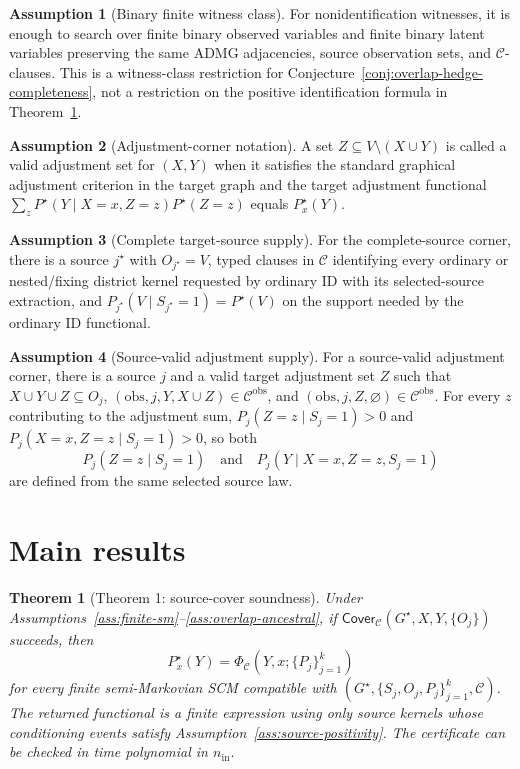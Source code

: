 \documentclass[11pt]{article}
\theoremstyle{definition}
\newtheorem{assumption}{Assumption}
\theoremstyle{plain}
\newtheorem{theorem}{Theorem}
\theoremstyle{remark}
\begin{document}
\begin{assumption}[Binary finite witness class]\label{ass:binary-witness}
For nonidentification witnesses, it is enough to search over finite binary
observed variables and finite binary latent variables preserving the same
ADMG adjacencies, source observation sets, and \(\mathcal C\)-clauses.  This
is a witness-class restriction for Conjecture~\ref{conj:overlap-hedge-completeness},
not a restriction on the positive identification formula in
Theorem~\ref{thm:source-cover-soundness}.
\end{assumption}

\begin{assumption}[Adjustment-corner notation]\label{ass:adjustment-corner}
A set \(Z\subseteq V\setminus (X\cup Y)\) is called a valid adjustment set for
\((X,Y)\) when it satisfies the standard graphical adjustment criterion in
the target graph and the target adjustment functional
\(\sum_z P^\star(Y\mid X=x,Z=z)P^\star(Z=z)\) equals \(P^\star_x(Y)\).
\end{assumption}

\begin{assumption}[Complete target-source supply]\label{ass:complete-source}
For the complete-source corner, there is a source \(j^\star\) with
\(O_{j^\star}=V\), typed clauses in \(\mathcal C\) identifying every
ordinary or nested/fixing district kernel requested by ordinary ID with its
selected-source extraction, and
\(P_{j^\star}(V\mid S_{j^\star}=1)=P^\star(V)\) on the support needed by the
ordinary ID functional.
\end{assumption}

\begin{assumption}[Source-valid adjustment supply]\label{ass:source-valid-adjustment}
For a source-valid adjustment corner, there is a source \(j\) and a valid
target adjustment set \(Z\) such that \(X\cup Y\cup Z\subseteq O_j\),
\((\mathrm{obs},j,Y,X\cup Z)\in\mathcal C^{\mathrm{obs}}\), and
\((\mathrm{obs},j,Z,\varnothing)\in\mathcal C^{\mathrm{obs}}\).  For
every \(z\) contributing to the adjustment sum, \(P_j(Z=z\mid S_j=1)>0\) and
\(P_j(X=x,Z=z\mid S_j=1)>0\), so both
\[
  P_j(Z=z\mid S_j=1)
  \quad\text{and}\quad
  P_j(Y\mid X=x,Z=z,S_j=1)
\]
are defined from the same selected source law.
\end{assumption}

\section{Main results}
\begin{theorem}[Theorem 1: source-cover soundness]\label{thm:source-cover-soundness}
Under Assumptions~\ref{ass:finite-sm}--\ref{ass:overlap-ancestral}, if
\(\mathsf{Cover}_{\mathcal C}(G^\star,X,Y,\{O_j\})\) succeeds, then
\[
  P^\star_x(Y)=\Phi_{\mathcal C}(Y,x;\{P_j\}_{j=1}^k)
\]
for every finite semi-Markovian SCM compatible with
\((G^\star,\{S_j,O_j,P_j\}_{j=1}^k,\mathcal C)\).  The returned functional is
a finite expression using only source kernels whose conditioning events
satisfy Assumption~\ref{ass:source-positivity}.  The certificate can be
checked in time polynomial in \(n_{\mathrm{in}}\).
\end{theorem}
\end{document}
